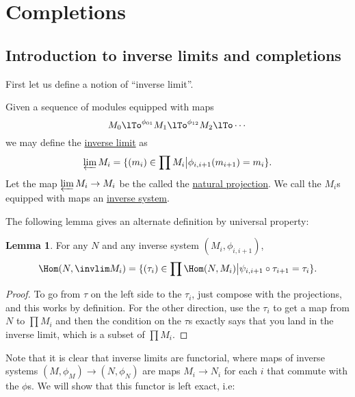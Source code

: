 \documentclass[12 pt]{article}
\theoremstyle{definition}
\newtheorem{lemma}[theorem]{Lemma}
\begin{document}
\newpage




\section{Completions}

\subsection{Introduction to inverse limits and completions}

First let us define a notion of ``inverse limit''.
\begin{definition} Given a sequence of modules equipped with maps
\[M_0 \lTo^{\phi_{01}} M_1 \lTo^{\phi_{12}} M_2 \lTo \cdots\]
we may define the \underline{inverse limit} as
\[\varprojlim M_i=\{(m_i) \in \prod M_i \big| \phi_{i,i+1}(m_{i+1})=m_i\}.\]
Let the map $\varprojlim M_i \to M_i$ be the called the \underline{natural projection}. We call the $M_i$s equipped with maps an \underline{inverse system}.
\end{definition}

The following lemma gives an alternate definition by universal property:
\begin{lemma} For any $N$ and any inverse system $(M_i, \phi_{i,i+1})$,
\[\Hom(N,\invlim M_i)=\{(\tau_i) \in \prod \Hom(N,M_i) \big| \psi_{i,i+1} \circ \tau_{i+1}=\tau_i\}.\]
\end{lemma}
\begin{proof} To go from $\tau$ on the left side to the $\tau_i$, just compose with the projections, and this works by definition. For the other direction, use the $\tau_i$ to get a map from $N$ to $\prod M_i$ and then the condition on the $\tau$s exactly says that you land in the inverse limit, which is a subset of $\prod M_i$.
\end{proof}


Note that it is clear that inverse limits are functorial, where maps of inverse systems $(M,\phi_M) \to (N,\phi_N)$ are maps $M_i \to N_i$ for each $i$ that commute with the $\phi$s. We will show that this functor is left exact, i.e:
\end{document}
